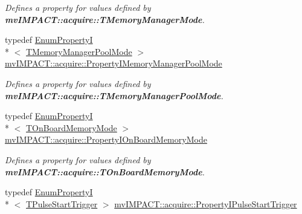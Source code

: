 \begin{DoxyCompactItemize}
\begin{DoxyCompactList}\small\item\em Defines a property for values defined by {\bfseries mv\+I\+M\+P\+A\+C\+T\+::acquire\+::\+T\+Memory\+Manager\+Mode}. \end{DoxyCompactList}\item 
\hypertarget{group___device_specific_interface_gae8ead74d2d3b067021f1eb34ecc16dd1}{typedef \hyperlink{classmv_i_m_p_a_c_t_1_1acquire_1_1_enum_property_i}{Enum\+Property\+I}\\*
$<$ \hyperlink{group___common_interface_ga01e39bfd4e5f1b4427bc403985f53835}{T\+Memory\+Manager\+Pool\+Mode} $>$ \hyperlink{group___device_specific_interface_gae8ead74d2d3b067021f1eb34ecc16dd1}{mv\+I\+M\+P\+A\+C\+T\+::acquire\+::\+Property\+I\+Memory\+Manager\+Pool\+Mode}}\label{group___device_specific_interface_gae8ead74d2d3b067021f1eb34ecc16dd1}

\begin{DoxyCompactList}\small\item\em Defines a property for values defined by {\bfseries mv\+I\+M\+P\+A\+C\+T\+::acquire\+::\+T\+Memory\+Manager\+Pool\+Mode}. \end{DoxyCompactList}\item 
\hypertarget{group___device_specific_interface_ga8f0448335d196077bb5866dfc16b0d7e}{typedef \hyperlink{classmv_i_m_p_a_c_t_1_1acquire_1_1_enum_property_i}{Enum\+Property\+I}\\*
$<$ \hyperlink{group___device_specific_interface_gafeb5475c72e0081fb102cb94b4c26a1b}{T\+On\+Board\+Memory\+Mode} $>$ \hyperlink{group___device_specific_interface_ga8f0448335d196077bb5866dfc16b0d7e}{mv\+I\+M\+P\+A\+C\+T\+::acquire\+::\+Property\+I\+On\+Board\+Memory\+Mode}}\label{group___device_specific_interface_ga8f0448335d196077bb5866dfc16b0d7e}

\begin{DoxyCompactList}\small\item\em Defines a property for values defined by {\bfseries mv\+I\+M\+P\+A\+C\+T\+::acquire\+::\+T\+On\+Board\+Memory\+Mode}. \end{DoxyCompactList}\item 
\hypertarget{group___device_specific_interface_gac582d13155205627b2f103a6d612c3df}{typedef \hyperlink{classmv_i_m_p_a_c_t_1_1acquire_1_1_enum_property_i}{Enum\+Property\+I}\\*
$<$ \hyperlink{group___device_specific_interface_gad2cb2c5b518e2428f7b81a3dafc5f0a0}{T\+Pulse\+Start\+Trigger} $>$ \hyperlink{group___device_specific_interface_gac582d13155205627b2f103a6d612c3df}{mv\+I\+M\+P\+A\+C\+T\+::acquire\+::\+Property\+I\+Pulse\+Start\+Trigger}}\label{group___device_specific_interface_gac582d13155205627b2f103a6d612c3df}


\end{DoxyCompactItemize}
